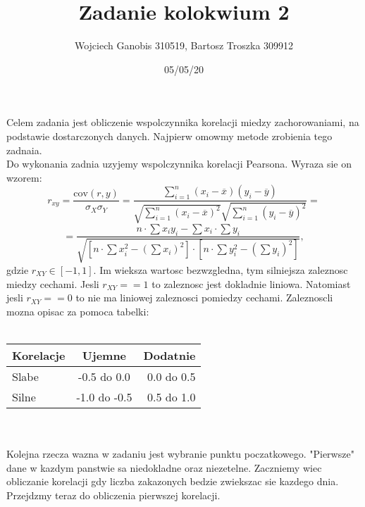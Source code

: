 \documentclass[12pt]{article}
\title{Zadanie kolokwium 2}
\author{Wojciech Ganobis 310519, Bartosz Troszka 309912}
\date{05/05/20}
\begin{document}
\maketitle
Celem  zadania jest obliczenie wspolczynnika korelacji miedzy zachorowaniami, na podstawie dostarczonych danych. Najpierw omowmy metode zrobienia tego zadnaia.\\
Do wykonania zadnia uzyjemy wspolczynnika korelacji Pearsona. Wyraza sie on wzorem:
$$r_{xy} = \frac{\mathrm{cov}(r, y)}{\sigma_X\sigma_Y} = \frac{\sum_{i=1}^n (x_i - \overline{x})(y_i - \overline{y})}{\sqrt{\sum_{i=1}^n (x_i - \overline{x})^2} \sqrt{\sum_{i=1}^n (y_i - \overline{y})^2}} =$$$$= \frac{n\cdot \sum x_{i}y_{i} - \sum x_{i} \cdot \sum y_{i}}{\sqrt{[n \cdot \sum x^{2}_{i} - (\sum x_{i})^{2}]\cdot[n \cdot \sum y^{2}_{i} - (\sum y_{i})^{2}]}},$$
gdzie $r_{XY} \in [-1, 1]$. Im wieksza wartosc bezwzgledna, tym silniejsza zaleznosc miedzy cechami. Jesli $r_{XY} == 1$ to zaleznosc jest dokladnie liniowa. Natomiast jesli $r_{XY} == 0$ to nie ma liniowej zaleznosci pomiedzy cechami. Zaleznoscli mozna opisac za pomoca tabelki:\\\\
\begin{tabular}{|l|c|r|} \hline
Korelacje & Ujemne & Dodatnie  \\
\hline 
Slabe & -0.5 do 0.0 & 0.0 do 0.5 \\
\hline 
Silne & -1.0 do -0.5 & 0.5 do 1.0 \\
\hline 
\end{tabular}\\\\
Kolejna rzecza wazna w zadaniu jest wybranie punktu poczatkowego. "Pierwsze" dane w kazdym panstwie sa niedokladne oraz niezetelne. Zaczniemy wiec obliczanie korelacji gdy liczba zakazonych bedzie zwiekszac sie kazdego dnia.\\
Przejdzmy teraz do obliczenia pierwszej korelacji.\\ \\
\end{document}
